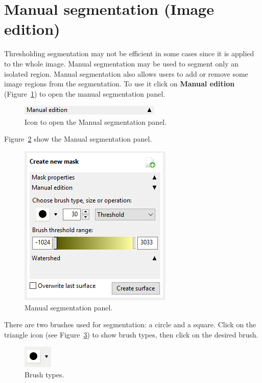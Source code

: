 \section{Manual segmentation (Image edition)}

Thresholding segmentation may not be efficient in some cases since it is applied to the whole image. Manual segmentation may be used to segment only an isolated region. Manual segmentation also allows users to add or remove some image regions from the segmentation. To use it click on \textbf{Manual edition} (Figure~\ref{fig:advanced_edition}) to open the manual segmentation panel.

\begin{figure}[!htb]
\centering
\includegraphics[scale=0.75]{../user_guide_figures/invesalius_screen/segmentation_manual_label_en.png}
\caption{Icon to open the Manual segmentation panel.}
\label{fig:advanced_edition}
\end{figure}

Figure~\ref{fig:edition_slices_ref} show the Manual segmentation panel.

\begin{figure}[!htb]
\centering
\includegraphics[scale=0.6]{../user_guide_figures/invesalius_screen/segmentation_manual_window_en.png}
\caption{Manual segmentation panel.}
\label{fig:edition_slices_ref}
\end{figure}

There are two brushes used for segmentation: a circle and a square. Click on the triangle icon (see Figure~\ref{fig:brush_type}) to show brush types, then click on the desired brush.

\begin{figure}[!htb]
\centering
\includegraphics[scale=0.9]{../user_guide_figures/invesalius_screen/segmentation_manual_pencil_type.png}
\caption{Brush types.}
\label{fig:brush_type}
\end{figure}

